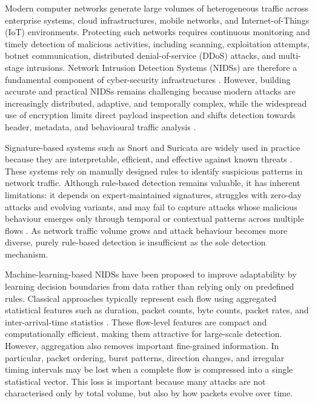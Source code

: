 \documentclass[11pt,fleqn]{report}
\begin{document}
Modern computer networks generate large volumes of heterogeneous traffic across enterprise systems, cloud infrastructures, mobile networks, and Internet-of-Things (IoT) environments. Protecting such networks requires continuous monitoring and timely detection of malicious activities, including scanning, exploitation attempts, botnet communication, distributed denial-of-service (DDoS) attacks, and multi-stage intrusions. Network Intrusion Detection Systems (NIDSs) are therefore a fundamental component of cyber-security infrastructures \cite{Roesch1999,SommerPaxson2010}. However, building accurate and practical NIDSs remains challenging because modern attacks are increasingly distributed, adaptive, and temporally complex, while the widespread use of encryption limits direct payload inspection and shifts detection towards header, metadata, and behavioural traffic analysis \cite{Sharma2025EncryptedSurvey,Dong2025EncryptedPretrain}.

Signature-based systems such as Snort and Suricata are widely used in practice because they are interpretable, efficient, and effective against known threats \cite{Roesch1999,SuricataGuide2026}. These systems rely on manually designed rules to identify suspicious patterns in network traffic. Although rule-based detection remains valuable, it has inherent limitations: it depends on expert-maintained signatures, struggles with zero-day attacks and evolving variants, and may fail to capture attacks whose malicious behaviour emerges only through temporal or contextual patterns across multiple flows \cite{SommerPaxson2010,Hozouri2025Survey}. As network traffic volume grows and attack behaviour becomes more diverse, purely rule-based detection is insufficient as the sole detection mechanism.

Machine-learning-based NIDSs have been proposed to improve adaptability by learning decision boundaries from data rather than relying only on predefined rules. Classical approaches typically represent each flow using aggregated statistical features such as duration, packet counts, byte counts, packet rates, and inter-arrival-time statistics \cite{BuczakGuven2016,Ahmed2016Survey}. These flow-level features are compact and computationally efficient, making them attractive for large-scale detection. However, aggregation also removes important fine-grained information. In particular, packet ordering, burst patterns, direction changes, and irregular timing intervals may be lost when a complete flow is compressed into a single statistical vector. This loss is important because many attacks are not characterised only by total volume, but also by how packets evolve over time.
\end{document}
